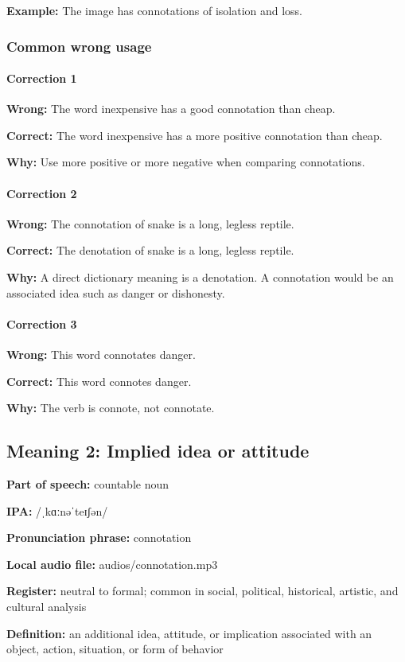 \documentclass[11pt]{article}
\begin{document}
\textbf{Example:} The image has connotations of isolation and loss.

\subsubsection{Common wrong usage}
\paragraph{Correction 1}
\textbf{Wrong:} The word inexpensive has a good connotation than cheap.

\textbf{Correct:} The word inexpensive has a more positive connotation than cheap.

\textbf{Why:} Use more positive or more negative when comparing connotations.

\paragraph{Correction 2}
\textbf{Wrong:} The connotation of snake is a long, legless reptile.

\textbf{Correct:} The denotation of snake is a long, legless reptile.

\textbf{Why:} A direct dictionary meaning is a denotation. A connotation would be an associated idea such as danger or dishonesty.

\paragraph{Correction 3}
\textbf{Wrong:} This word connotates danger.

\textbf{Correct:} This word connotes danger.

\textbf{Why:} The verb is connote, not connotate.

\subsection{Meaning 2: Implied idea or attitude}
\textbf{Part of speech:} countable noun

\textbf{IPA:} /ˌkɑːnəˈteɪʃən/

\textbf{Pronunciation phrase:} connotation

\textbf{Local audio file:} audios/connotation.mp3

\textbf{Register:} neutral to formal; common in social, political, historical, artistic, and cultural analysis

\textbf{Definition:} an additional idea, attitude, or implication associated with an object, action, situation, or form of behavior
\end{document}
